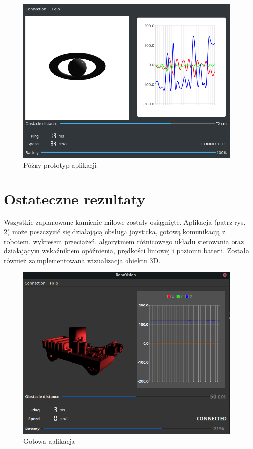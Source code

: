\documentclass[12pt,a4paper,polish]{article}
\begin{document}
  \begin{figure}[ht]
    \centering
    \includegraphics[width=1\textwidth]{img/app.png}
    \caption{Póżny prototyp aplikacji}
    \label{fig:proto}
  \end{figure}
  
  \newpage
  \section{Ostateczne rezultaty}
  Wszystkie zaplanowane kamienie milowe zostały osiągnięte. Aplikacja (patrz rys.\,\ref{fig:app}) może 
  poszczycić się działającą obsługa joysticka, gotową komunikacją z robotem,
  wykresem przeciążeń, algorytmem różnicowego układu sterowania oraz działającym
  wskaźnikiem opóźnienia, prędkości liniowej i poziomu baterii. 
  Została również zaimplementowana wizualizacja obiektu 3D. 

  \begin{figure}[ht]
    \centering
    \includegraphics[width=1\textwidth]{img/final/app.png}
    \caption{Gotowa aplikacja}
    \label{fig:app}
  \end{figure}
\end{document}
